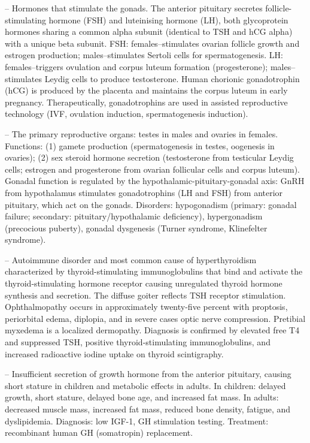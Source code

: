 -- Hormones that stimulate the gonads. The anterior pituitary secretes follicle-stimulating hormone (FSH) and luteinising hormone (LH), both glycoprotein hormones sharing a common alpha subunit (identical to TSH and hCG alpha) with a unique beta subunit. FSH: females--stimulates ovarian follicle growth and estrogen production; males--stimulates Sertoli cells for spermatogenesis. LH: females--triggers ovulation and corpus luteum formation (progesterone); males--stimulates Leydig cells to produce testosterone. Human chorionic gonadotrophin (hCG) is produced by the placenta and maintains the corpus luteum in early pregnancy. Therapeutically, gonadotrophins are used in assisted reproductive technology (IVF, ovulation induction, spermatogenesis induction).

-- The primary reproductive organs: testes in males and ovaries in females. Functions: (1) gamete production (spermatogenesis in testes, oogenesis in ovaries); (2) sex steroid hormone secretion (testosterone from testicular Leydig cells; estrogen and progesterone from ovarian follicular cells and corpus luteum). Gonadal function is regulated by the hypothalamic-pituitary-gonadal axis: GnRH from hypothalamus stimulates gonadotrophins (LH and FSH) from anterior pituitary, which act on the gonads. Disorders: hypogonadism (primary: gonadal failure; secondary: pituitary/hypothalamic deficiency), hypergonadism (precocious puberty), gonadal dysgenesis (Turner syndrome, Klinefelter syndrome).

-- Autoimmune disorder and most common cause of hyperthyroidism characterized by thyroid-stimulating immunoglobulins that bind and activate the thyroid-stimulating hormone receptor causing unregulated thyroid hormone synthesis and secretion. The diffuse goiter reflects TSH receptor stimulation. Ophthalmopathy occurs in approximately twenty-five percent with proptosis, periorbital edema, diplopia, and in severe cases optic nerve compression. Pretibial myxedema is a localized dermopathy. Diagnosis is confirmed by elevated free T4 and suppressed TSH, positive thyroid-stimulating immunoglobulins, and increased radioactive iodine uptake on thyroid scintigraphy.

-- Insufficient secretion of growth hormone from the anterior pituitary, causing short stature in children and metabolic effects in adults. In children: delayed growth, short stature, delayed bone age, and increased fat mass. In adults: decreased muscle mass, increased fat mass, reduced bone density, fatigue, and dyslipidemia. Diagnosis: low IGF-1, GH stimulation testing. Treatment: recombinant human GH (somatropin) replacement.

